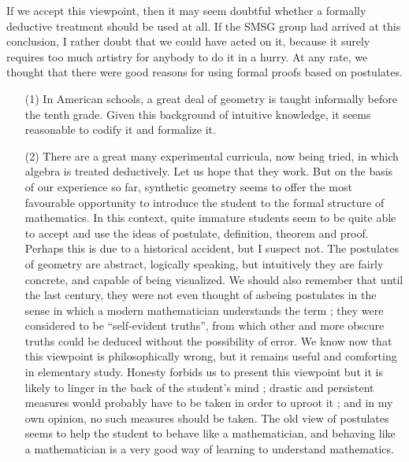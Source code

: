 If we accept this viewpoint, then it may seem doubtful whether a
formally deductive treatment should be used at all. If the SMSG group
had arrived at this conclusion, I rather doubt that we could have
acted on it, because it surely requires too much artistry for anybody
to do it in a hurry. At any rate, we thought that there were good
reasons for using formal proofs based on postulates.
\begin{itemize}
\item[(1)] In American schools, a great deal of geometry is taught
  informally before the tenth grade. Given this background of
  intuitive knowledge, it seems reasonable to codify it and formalize it.

\item[(2)] There are a great many experimental curricula, now being
  tried, in which algebra is treated deductively. Let us hope that
  they work. But on the basis of our experience so far, synthetic
  geometry seems to offer the most favourable opportunity to introduce
  the student to the formal structure of mathematics. In this context,
  quite immature students seem to be quite able to accept and use the
  ideas of postulate, definition, theorem and proof. Perhaps this is
  due to a historical accident, but I suspect not. The postulates of
  geometry are abstract, logically speaking, but intuitively they are
  fairly concrete, and capable of being visualized. We should also
  remember that until the last century, they were not even thought of
  as\pageoriginale being postulates in the sense in which a modern
  mathematician understands the term ; they were considered to be
  ``self-evident truths'', from which other and more obscure truths
  could be deduced without the possibility of error. We know now that
  this viewpoint is philosophically wrong, but it remains useful and
  comforting in elementary study. Honesty forbids us to present this
  viewpoint but it is likely to linger in the back of the student's
  mind ; drastic and persistent measures would probably have to be
  taken in order to uproot it ; and in my own opinion, no such
  measures should be taken. The old view of postulates seems to help
  the student to behave like a mathematician, and behaving like a
  mathematician is a very good way of learning to understand mathematics.
\end{itemize}

